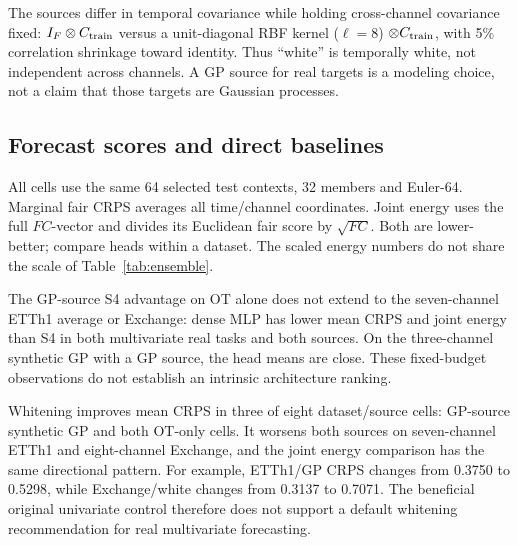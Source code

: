 \documentclass[10pt,twocolumn]{article}
\begin{document}
The sources differ in temporal covariance while holding cross-channel covariance fixed: $I_F\otimes C_{\rm train}$ versus a unit-diagonal RBF kernel ($\ell=8$) $\otimes C_{\rm train}$, with 5\% correlation shrinkage toward identity. Thus ``white'' is temporally white, not independent across channels. A GP source for real targets is a modeling choice, not a claim that those targets are Gaussian processes.

\subsection{Forecast scores and direct baselines}
All cells use the same 64 selected test contexts, 32 members and Euler-64. Marginal fair CRPS averages all time/channel coordinates. Joint energy uses the full $FC$-vector and divides its Euclidean fair score by $\sqrt{FC}$. Both are lower-better; compare heads within a dataset. The scaled energy numbers do not share the scale of Table~\ref{tab:ensemble}.

\begin{table}[h]
\centering\footnotesize
\caption{Extension fair CRPS, mean of three optimization seeds. W/G: temporally white/GP source; C: channels. Ridge includes whole-vector training-residual resampling and is shared across source rows.}\label{tab:multi_crps}
\end{table}

\begin{table}[h]
\centering\footnotesize
\caption{Joint fair energy divided by $\sqrt{FC}$ on the same contexts and ensembles as Table~\ref{tab:multi_crps}. No cross-dataset ranking is implied.}\label{tab:multi_energy}
\end{table}

The GP-source S4 advantage on OT alone does not extend to the seven-channel ETTh1 average or Exchange: dense MLP has lower mean CRPS and joint energy than S4 in both multivariate real tasks and both sources. On the three-channel synthetic GP with a GP source, the head means are close. These fixed-budget observations do not establish an intrinsic architecture ranking.

Whitening improves mean CRPS in three of eight dataset/source cells: GP-source synthetic GP and both OT-only cells. It worsens both sources on seven-channel ETTh1 and eight-channel Exchange, and the joint energy comparison has the same directional pattern. For example, ETTh1/GP CRPS changes from 0.3750 to 0.5298, while Exchange/white changes from 0.3137 to 0.7071. The beneficial original univariate control therefore does not support a default whitening recommendation for real multivariate forecasting.
\end{document}
